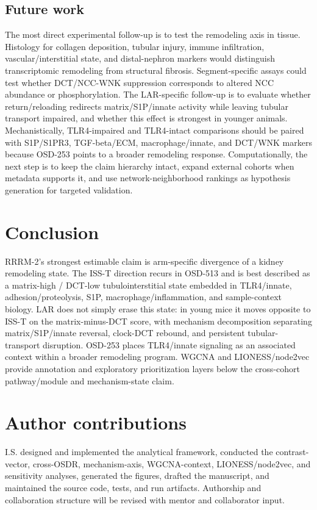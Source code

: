\documentclass[11pt]{article}
\begin{document}
\subsection{Future work}

The most direct experimental follow-up is to test the remodeling axis in tissue. Histology for collagen deposition, tubular injury, immune infiltration, vascular/interstitial state, and distal-nephron markers would distinguish transcriptomic remodeling from structural fibrosis. Segment-specific assays could test whether DCT/NCC-WNK suppression corresponds to altered NCC abundance or phosphorylation. The LAR-specific follow-up is to evaluate whether return/reloading redirects matrix/S1P/innate activity while leaving tubular transport impaired, and whether this effect is strongest in younger animals. Mechanistically, TLR4-impaired and TLR4-intact comparisons should be paired with S1P/S1PR3, TGF-beta/ECM, macrophage/innate, and DCT/WNK markers because OSD-253 points to a broader remodeling response. Computationally, the next step is to keep the claim hierarchy intact, expand external cohorts when metadata supports it, and use network-neighborhood rankings as hypothesis generation for targeted validation.

\section{Conclusion}

RRRM-2's strongest estimable claim is arm-specific divergence of a kidney remodeling state. The ISS-T direction recurs in OSD-513 and is best described as a matrix-high / DCT-low tubulointerstitial state embedded in TLR4/innate, adhesion/proteolysis, S1P, macrophage/inflammation, and sample-context biology. LAR does not simply erase this state: in young mice it moves opposite to ISS-T on the matrix-minus-DCT score, with mechanism decomposition separating matrix/S1P/innate reversal, clock-DCT rebound, and persistent tubular-transport disruption. OSD-253 places TLR4/innate signaling as an associated context within a broader remodeling program. WGCNA and LIONESS/node2vec provide annotation and exploratory prioritization layers below the cross-cohort pathway/module and mechanism-state claim.

\section*{Author contributions}
I.S. designed and implemented the analytical framework, conducted the contrast-vector, cross-OSDR, mechanism-axis, WGCNA-context, LIONESS/node2vec, and sensitivity analyses, generated the figures, drafted the manuscript, and maintained the source code, tests, and run artifacts. Authorship and collaboration structure will be revised with mentor and collaborator input.
\end{document}
